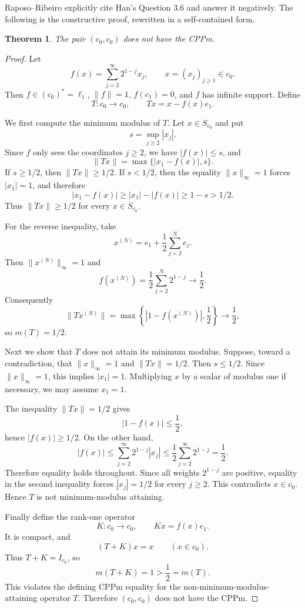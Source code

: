 \documentclass[11pt]{article}
\newtheorem*{theorem}{Theorem}
\begin{document}
Raposo--Ribeiro explicitly cite Han's Question 3.6 and answer it negatively.
The following is the constructive proof, rewritten in a self-contained form.

\begin{theorem}
The pair $(c_0,c_0)$ does not have the CPPm.
\end{theorem}

\begin{proof}
Let
\[
f(x)=\sum_{j=2}^{\infty}2^{1-j}x_j,\qquad x=(x_j)_{j\ge 1}\in c_0.
\]
Then $f\in (c_0)^*=\ell_1$, $\|f\|=1$, $f(e_1)=0$, and $f$ has infinite
support. Define
\[
T:c_0\to c_0,\qquad Tx=x-f(x)e_1.
\]

We first compute the minimum modulus of $T$. Let $x\in S_{c_0}$ and put
\[
s=\sup_{j\ge 2}|x_j|.
\]
Since $f$ only sees the coordinates $j\ge 2$, we have $|f(x)|\le s$, and
\[
\|Tx\|=\max\{|x_1-f(x)|,s\}.
\]
If $s\ge 1/2$, then $\|Tx\|\ge 1/2$. If $s<1/2$, then the equality
$\|x\|_\infty=1$ forces $|x_1|=1$, and therefore
\[
|x_1-f(x)|\ge |x_1|-|f(x)|\ge 1-s>1/2.
\]
Thus $\|Tx\|\ge 1/2$ for every $x\in S_{c_0}$.

For the reverse inequality, take
\[
x^{(N)}=e_1+\frac12\sum_{j=2}^{N}e_j.
\]
Then $\|x^{(N)}\|_\infty=1$ and
\[
f(x^{(N)})=\frac12\sum_{j=2}^{N}2^{1-j}\longrightarrow \frac12.
\]
Consequently
\[
\|Tx^{(N)}\|
=\max\left\{\left|1-f(x^{(N)})\right|,\frac12\right\}
\longrightarrow \frac12,
\]
so $m(T)=1/2$.

Next we show that $T$ does not attain its minimum modulus. Suppose, toward a
contradiction, that $\|x\|_\infty=1$ and $\|Tx\|=1/2$. Then $s\le 1/2$. Since
$\|x\|_\infty=1$, this implies $|x_1|=1$. Multiplying $x$ by a scalar of
modulus one if necessary, we may assume $x_1=1$.

The inequality $\|Tx\|=1/2$ gives
\[
|1-f(x)|\le \frac12,
\]
hence $|f(x)|\ge 1/2$. On the other hand,
\[
|f(x)|
\le \sum_{j=2}^{\infty}2^{1-j}|x_j|
\le \frac12\sum_{j=2}^{\infty}2^{1-j}
=\frac12.
\]
Therefore equality holds throughout. Since all weights $2^{1-j}$ are positive,
equality in the second inequality forces $|x_j|=1/2$ for every $j\ge 2$. This
contradicts $x\in c_0$. Hence $T$ is not minimum-modulus attaining.

Finally define the rank-one operator
\[
K:c_0\to c_0,\qquad Kx=f(x)e_1.
\]
It is compact, and
\[
(T+K)x=x\qquad (x\in c_0).
\]
Thus $T+K=I_{c_0}$, so
\[
m(T+K)=1>\frac12=m(T).
\]
This violates the defining CPPm equality for the non-minimum-modulus-attaining
operator $T$. Therefore $(c_0,c_0)$ does not have the CPPm.
\end{proof}
\end{document}
